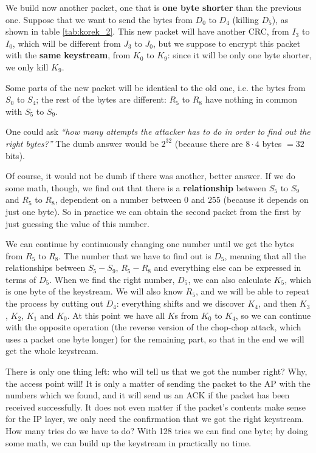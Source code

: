 We build now another packet, one that is \textbf{one byte shorter} than the previous one. Suppose that we want to send the bytes from $D_0$ to $D_4$ (killing $D_5$), as shown in table \ref{tab:korek_2}. This new packet will have another CRC, from $I_3$ to $I_0$, which will be different from $J_3$ to $J_0$, but we suppose to encrypt this packet with the \textbf{same keystream}, from $K_0$ to $K_9$: since it will be only one byte shorter, we only kill $K_9$.

Some parts of the new packet will be identical to the old one, i.e. the bytes from $S_0$ to $S_4$; the rest of the bytes are different: $R_5$ to $R_8$ have nothing in common with $S_5$ to $S_9$.

One could ask \textit{“how many attempts the attacker has to do in order to find out the right bytes?”} The dumb answer would be $2^{32}$ (because there are $8 \cdot 4$ bytes $= 32$ bits).

Of course, it would not be dumb if there was another, better answer. If we do some math, though, we find out that there is a \textbf{relationship} between $S_5$ to $S_9$ and $R_5$ to $R_8$, dependent on a number between $0$ and $255$ (because it depends on just one byte). So in practice we can obtain the second packet from the first by just guessing the value of this number.

We can continue by continuously changing one number until we get the bytes from $R_5$ to $R_8$. The number that we have to find out is $D_5$, meaning that all the relationships between $S_5 -  S_9$, $R_5 - R_8$ and everything else can be expressed in terms of $D_5$. When we find the right number, $D_5$, we can also calculate $K_5$, which is one byte of the keystream. We will also know $R_5$, and we will be able to repeat the process by cutting out $D_4$: everything shifts and we discover $K_4$, and then $K_3$, $K_2$, $K_1$ and $K_0$. At this point we have all $K$s from $K_0$ to $K_4$, so we can continue with the opposite operation (the reverse version of the chop-chop attack, which uses a packet one byte longer) for the remaining part, so that in the end we will get the whole keystream.

\vspace{0.5em}

There is only one thing left: who will tell us that we got the number right? Why, the access point will! It is only a matter of sending the packet to the AP with the numbers which we found, and it will send us an ACK if the packet has been received successfully. It does not even matter if the packet’s contents make sense for the IP layer, we only need the confirmation that we got the right keystream. How many tries do we have to do? With 128 tries we can find one byte; by doing some math, we can build up the keystream in practically no time.

